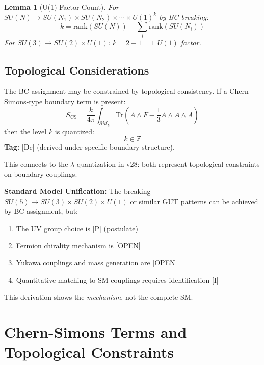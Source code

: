 \documentclass[11pt,a4paper]{article}
\newtheorem{lemma}[theorem]{Lemma}
\begin{document}
\begin{lemma}[U(1) Factor Count]
\label{lem:u1-count}
For $SU(N) \to SU(N_1) \times SU(N_2) \times \cdots \times U(1)^k$ by BC breaking:
\begin{equation}
  k = \text{rank}(SU(N)) - \sum_i \text{rank}(SU(N_i))
  \label{eq:u1-count}
\end{equation}
For $SU(3) \to SU(2) \times U(1)$: $k = 2 - 1 = 1$ $U(1)$ factor.
\end{lemma}

\subsection{Topological Considerations}

The BC assignment may be constrained by topological consistency. If a
Chern-Simons-type boundary term is present:
\begin{equation}
  S_{\text{CS}} = \frac{k}{4\pi} \int_{\partial\mathcal{M}_5} \text{Tr}(A \wedge F - \frac{1}{3} A \wedge A \wedge A)
  \label{eq:cs-term}
\end{equation}
then the level $k$ is quantized:
\begin{equation}
  k \in \mathbb{Z}
  \label{eq:cs-quantization}
\end{equation}
\textbf{Tag:} [Dc] (derived under specific boundary structure).

This connects to the $\lambda$-quantization in v28: both represent topological
constraints on boundary couplings.

\begin{openitembox}
\textbf{Standard Model Unification:} The breaking $SU(5) \to SU(3) \times SU(2) \times U(1)$
or similar GUT patterns can be achieved by BC assignment, but:
\begin{enumerate}
  \item The UV group choice is [P] (postulate)
  \item Fermion chirality mechanism is [OPEN]
  \item Yukawa couplings and mass generation are [OPEN]
  \item Quantitative matching to SM couplings requires identification [I]
\end{enumerate}
This derivation shows the \emph{mechanism}, not the complete SM.
\end{openitembox}

\section{Chern-Simons Terms and Topological Constraints}
\label{sec:cs-terms}
\end{document}
